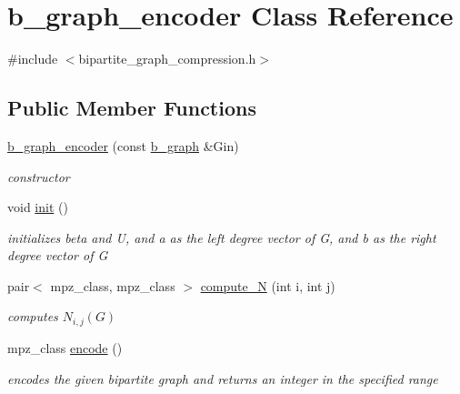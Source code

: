 \hypertarget{classb__graph__encoder}{}\section{b\+\_\+graph\+\_\+encoder Class Reference}
\label{classb__graph__encoder}


{\ttfamily \#include $<$bipartite\+\_\+graph\+\_\+compression.\+h$>$}

\subsection*{Public Member Functions}
\begin{DoxyCompactItemize}
\item 
\hyperlink{classb__graph__encoder_a03c88fac38f7b125212a524af8dc84ed}{b\+\_\+graph\+\_\+encoder} (const \hyperlink{classb__graph}{b\+\_\+graph} \&Gin)
\begin{DoxyCompactList}\small\item\em constructor \end{DoxyCompactList}\item 
void \hyperlink{classb__graph__encoder_a844cff8771a706d4de2abeec1312ff04}{init} ()
\begin{DoxyCompactList}\small\item\em initializes beta and U, and a as the left degree vector of G, and b as the right degree vector of G \end{DoxyCompactList}\item 
pair$<$ mpz\+\_\+class, mpz\+\_\+class $>$ \hyperlink{classb__graph__encoder_a58e4aae68aab6cd8e4d34fc6b658c380}{compute\+\_\+N} (int i, int j)
\begin{DoxyCompactList}\small\item\em computes $N_{i,j}(G)$ \end{DoxyCompactList}\item 
mpz\+\_\+class \hyperlink{classb__graph__encoder_ab238f7cf40295274caf554eef6347e74}{encode} ()
\begin{DoxyCompactList}\small\item\em encodes the given bipartite graph and returns an integer in the specified range \end{DoxyCompactList}\end{DoxyCompactItemize}
